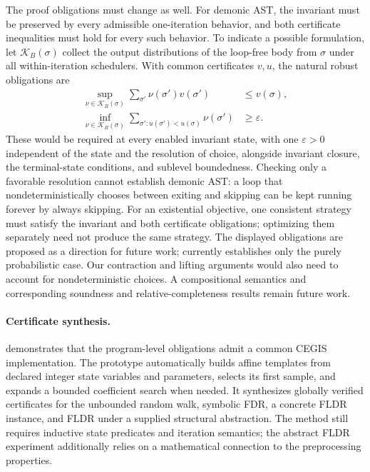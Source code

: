 The proof obligations must change as well. For demonic AST, the invariant must be preserved by every admissible one-iteration behavior, and both certificate inequalities must hold for every such behavior. To indicate a possible formulation, let $\mathcal{K}_B(\sigma)$ collect the output distributions of the loop-free body from $\sigma$ under all within-iteration schedulers. With common certificates $v,u$, the natural robust obligations are
\begin{align*}
 \sup_{\nu\in\mathcal{K}_B(\sigma)}
   \sum_{\sigma'}\nu(\sigma')v(\sigma')
   &\leq v(\sigma),\\
 \inf_{\nu\in\mathcal{K}_B(\sigma)}
   \sum_{\sigma':u(\sigma')<u(\sigma)}\nu(\sigma')
   &\geq\varepsilon.
\end{align*}
These would be required at every enabled invariant state, with one $\varepsilon>0$ independent of the state and the resolution of choice, alongside invariant closure, the terminal-state conditions, and sublevel boundedness. Checking only a favorable resolution cannot establish demonic AST: a loop that nondeterministically chooses between exiting and skipping can be kept running forever by always skipping. For an existential objective, one consistent strategy must satisfy the invariant and both certificate obligations; optimizing them separately need not produce the same strategy. The displayed obligations are proposed as a direction for future work;  currently establishes only the purely probabilistic case. Our contraction and lifting arguments would also need to account for nondeterministic choices. A compositional semantics and corresponding soundness and relative-completeness results remain future work.

\paragraph{Certificate synthesis.}
 demonstrates that the program-level
obligations admit a common CEGIS implementation. The prototype automatically
builds affine templates from declared integer state variables and parameters,
selects its first sample, and expands a bounded coefficient search when needed.
It synthesizes globally verified certificates for the unbounded random walk,
symbolic FDR, a concrete FLDR instance, and FLDR under a supplied structural
abstraction. The method still requires inductive state predicates and iteration
semantics; the abstract FLDR experiment additionally relies on a mathematical
connection to the preprocessing properties.

